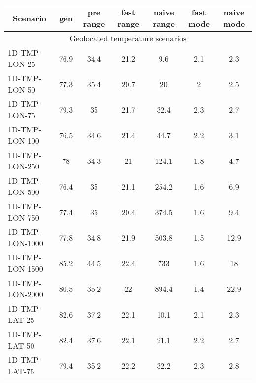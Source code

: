 \documentclass{article}
\begin{document}
    \begin{table}[h]
        \hskip0.8cm
        \begin{center}
        \begin{tabular}{|l||c|c|c|c|c|c|}
            \hline
            \multicolumn{1}{|c|}{Scenario} & gen  & pre range & fast range & naive range & fast mode & naive mode \\
            \hline
            \hline
            \multicolumn{7}{|c|}{Geolocated temperature scenarios}                                                 \\
            \hline
            1D-TMP-LON-25                       & 76.9 & 34.4       & 21.2       & 9.6         & 2.1       & 2.3        \\
            1D-TMP-LON-50                       & 77.3 & 35.4       & 20.7       & 20          & 2         & 2.5        \\
            1D-TMP-LON-75                       & 79.3 & 35         & 21.7       & 32.4        & 2.3       & 2.7        \\
            1D-TMP-LON-100                      & 76.5 & 34.6       & 21.4       & 44.7        & 2.2       & 3.1        \\
            1D-TMP-LON-250                      & 78   & 34.3       & 21         & 124.1       & 1.8       & 4.7        \\
            1D-TMP-LON-500                      & 76.4 & 35         & 21.1       & 254.2       & 1.6       & 6.9        \\
            1D-TMP-LON-750                      & 77.4 & 35         & 20.4       & 374.5       & 1.6       & 9.4        \\
            1D-TMP-LON-1000                     & 77.8 & 34.8       & 21.9       & 503.8       & 1.5       & 12.9       \\
            1D-TMP-LON-1500                     & 85.2 & 44.5       & 22.4       & 733         & 1.6       & 18         \\
            1D-TMP-LON-2000                     & 80.5 & 35.2       & 22         & 894.4       & 1.4       & 22.9       \\
            \hline
            1D-TMP-LAT-25                       & 82.6 & 37.2       & 22.1       & 10.1        & 2.1       & 2.3        \\
            1D-TMP-LAT-50                       & 82.4 & 37.6       & 22.1       & 21.1        & 2.2       & 2.7        \\
            1D-TMP-LAT-75                       & 79.4 & 35.2       & 22.2       & 32.2        & 2.3       & 2.8        \\

\end{tabular}
\end{center}
\end{table}
\end{document}
